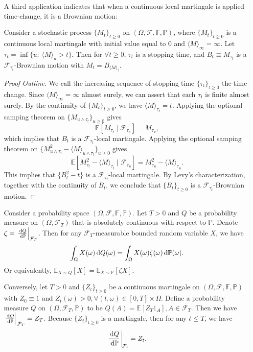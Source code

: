 A third application indicates that when a continuous local martingale is applied time-change, it is a Brownian motion:
\begin{theorem}
Consider a stochastic process $\{M_t\}_{t\ge0}$ on $(\Omega, \mathcal{F},\mathbb{F},\mathbb{P})$,
where $\{M_t\}_{t\ge0}$ is a continuous local martingale with initial value equal to $0$ and $\langle M\rangle_\infty=\infty$.
Let $\tau_t=\inf\{u:~\langle M\rangle_u>t\}$.
Then for $\forall t\ge0$, $\tau_t$ is a stopping time, and $B_t\equiv M_{\tau_t}$ is a $\mathcal{F}_{\tau_t}$-Brownian motion with $M_t=B_{\langle M\rangle_t}$.
\end{theorem}
\begin{proof}[Proof Outline]
We call the increasing sequence of stopping time $\{\tau_t\}_{t\ge0}$ the time-change.
Since $\langle M\rangle_\infty=\infty$ almost surely, we can assert that each $\tau_t$ is finite almost surely.
By the continuity of $\{M_t\}_{t\ge0}$, we have $\langle M\rangle_{\tau_t}=t$.
Applying the optional samping theorem on $\{M_{u\land\tau_t}\}_{u\ge0}$ gives
\[
\mathbb{E}[M_{\tau_t}\mid\mathcal{F}_{\tau_u}]=M_{\tau_u},
\]
which implies that $B_t$ is a $\mathcal{F}_{\tau_t}$-local martingale. 
Applying the optional samping theorem on $\{M_{u\land\tau_t}^2 - \langle M\rangle_{u\land\tau_t}\}_{u\ge0}$ gives
\[
\mathbb{E}[
M_{\tau_t}^2 -  \langle M\rangle_{\tau_t}\mid\mathcal{F}_{\tau_u}
]
=
M_{\tau_u}^2 -  \langle M\rangle_{\tau_u}.
\]
This implies that $\{B_t^2-t\}$ is a $\mathcal{F}_{\tau_t}$-local martingale. 
By Levy's characterization, together with the continuity of $B_t$, we conclude that $\{B_t\}_{t\ge0}$ is a $\mathcal{F}_{\tau_t}$-Brownian motion.
\end{proof}

\begin{example}
Consider a probability space $(\Omega, \mathcal{F},\mathbb{F},\mathbb{P})$. Let $T>0$ and $Q$ be a probability measure on $(\Omega,\mathcal{F}_{T})$ that is absolutely continuous with respect to $\mathbb{P}$. Denote $\zeta = \left.\frac{\,\mathrm{d} Q}{\,\mathrm{d}\mathbb{P}}\right|_{\mathcal{F}_{T}}$.
Then for any $\mathcal{F}_T$-measurable bounded random variable $X$, we have
\[
\int_{\Omega}X(\omega)\,\mathrm{d} Q(\omega) = \int_{\Omega} X(\omega)\zeta(\omega)\,\mathrm{d}\mathbb{P}(\omega).
\]
Or equivalently, $\mathbb{E}_{X\sim Q}[X] = \mathbb{E}_{X\sim \mathbb{P}}[\zeta X]$.

Conversely, let $T>0$ and $\{Z_t\}_{t\ge0}$ be a continuous martingale on $(\Omega, \mathcal{F},\mathbb{F},\mathbb{P})$ with $Z_0\equiv1$ and $Z_t(\omega)>0,\forall (t,\omega)\in[0,T]\times\Omega$.
Define a probability measure $Q$ on $(\Omega,\mathcal{F}_T,\mathbb{P})$ to be $Q(A)=\mathbb{E}[Z_T1_A], A\in\mathcal{F}_T$. Then we have $\left.\frac{\,\mathrm{d} Q}{\,\mathrm{d}\mathbb{P}}\right|_{\mathcal{F}_{T}}=Z_T$. Because $\{Z_t\}_{t\ge0}$ is a martingale, then for any $t\le T$, we have 
\[
\left.\frac{\,\mathrm{d} Q}{\,\mathrm{d}\mathbb{P}}\right|_{\mathcal{F}_{t}}=Z_t.
\]
\end{example}

